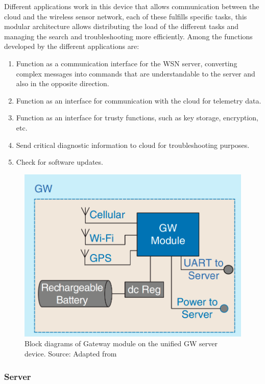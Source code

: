 \documentclass[journal]{IEEEtran}	%
\begin{document}
Different applications work in this device that allows communication between the cloud and the wireless sensor network, each of these fulfills specific tasks, this modular architecture allows distributing the load of the different tasks and managing the search and troubleshooting more efficiently. Among the functions developed by the different applications are:

\begin{enumerate}
\item Function as a communication interface for the WSN server, converting complex messages into commands that are understandable to the server and also in the opposite direction.
\item Function as an interface for communication with the cloud for telemetry data.
\item Function as an interface for trusty functions, such as key storage, encryption, etc.
\item Send critical diagnostic information to cloud for troubleshooting purposes.
\item Check for software updates.
\end{enumerate}

\begin{figure}[H]
\centering
\includegraphics[width=0.9\columnwidth]{fig4.png}
\caption{Block diagrams of Gateway module on the unified GW server device. Source: Adapted from \cite{williams2017weaving}}
\label{fig:gateway}
\end{figure}

\subsubsection{Server}
\end{document}
